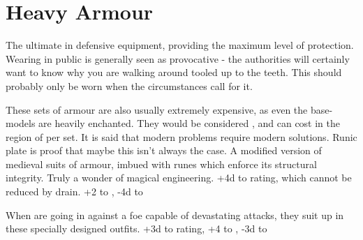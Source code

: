 \section{Heavy Armour}

The ultimate in defensive equipment, providing the maximum level of protection. Wearing  in public is generally seen as provocative - the authorities will certainly want to know why you are walking around tooled up to the teeth. This should probably only be worn when the circumstances call for it. 

These sets of armour are also usually extremely expensive, as even the base-models are heavily enchanted. They would be considered , and can cost in the region of  per set.
{
	It is said that modern problems require modern solutions. Runic plate is proof that\comma{} maybe\comma{} this isn't always the case. A modified version of medieval  suits of armour, imbued with runes which enforce its structural integrity. Truly a wonder of magical engineering.
}
{
	+4d to  rating, which cannot be reduced by drain. +2 to , -4d to 
}

{
	When  are going in against a foe capable of devastating attacks, they suit up in these specially designed outfits. 
}
{
	+3d to  rating, +4 to , -3d to 
}





